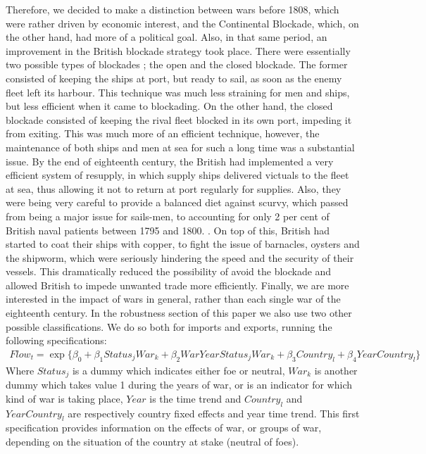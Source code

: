 \documentclass[12pt,a4paper,notitlepage,english]{article}
\begin{document}
Therefore, we decided to make a distinction between wars before 1808, which were rather driven by economic interest, and the Continental Blockade, which, on the other hand, had more of a political goal.
Also, in that same period, an improvement in the British blockade strategy took place.
There were essentially two possible types of blockades \citep{rainerdevelopment}; the open and the closed blockade.
The former consisted of keeping the ships at port, but ready to sail, as soon as the enemy fleet left its harbour.
This technique was much less straining for men and ships, but less efficient when it came to blockading.
On the other hand, the closed blockade consisted of keeping the rival fleet blocked in its own port, impeding it from exiting.
This was much more of an efficient technique, however, the maintenance of both ships and men at sea for such a long time was a substantial issue.
By the end of eighteenth century, the British had implemented a very efficient system of resupply, in which supply ships delivered victuals to the fleet at sea, thus allowing it not to return at port regularly for supplies.
Also, they were being very careful to provide a balanced diet against scurvy, which passed from being a major issue for sails-men, to accounting for only 2 per cent of British naval patients between 1795 and 1800.
\citep{rodger2005command}.
On top of this, British had started to coat their ships with copper, to fight the issue of barnacles, oysters and the shipworm, which were seriously hindering the speed and the security of their vessels.
This dramatically reduced the possibility of avoid the blockade and allowed British to impede unwanted trade more efficiently.
Finally, we are more interested in the impact of wars in general, rather than each single war of the eighteenth century.
In the robustness section of this paper we also use two other possible classifications.
We do so both for imports and exports, running the following specifications: 
\begin{multline}\label{eq:1}
Flow_{t}=\exp\{\beta_0+\beta_1Status_jWar_k + \beta_2WarYearStatus_jWar_k+\beta_3Country_l +\beta_4YearCountry_l\}
\end{multline}
Where $Status_j$ is a dummy which indicates either foe or neutral, $War_k$ is another dummy which takes value 1 during the years of war, or is an indicator for which kind of war is taking place, $Year$ is the time trend and $Country_l$ and $YearCountry_l$ are respectively country fixed effects and year time trend.
This first specification provides information on the effects of war, or groups of war, depending on the situation of the country at stake (neutral of foes).
\end{document}
